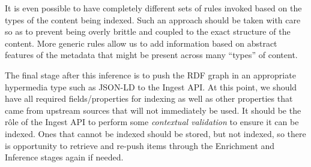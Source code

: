 It is even possible to have
completely different sets of rules invoked based on the types of the content
being indexed. Such an approach should be taken with care so as to prevent
being overly brittle and coupled to the exact structure of the content. More
generic rules allow us to add information based on abstract features of the
metadata that might be present across many ``types'' of content.

The final stage after this inference is to push the RDF graph in
an appropriate hypermedia type such as JSON-LD to the Ingest API. At this
point, we should have all required fields/properties for indexing as
well as other properties that came from upstream sources that will not
immediately be used. It should be the r\^ole of the Ingest API to perform
some \emph{contextual validation}\cite{fowler2005contextual} to ensure
it can be indexed. Ones that cannot be indexed should be stored, but
not indexed, so there is opportunity to retrieve and re-push items through
the Enrichment and Inference stages again if needed.
